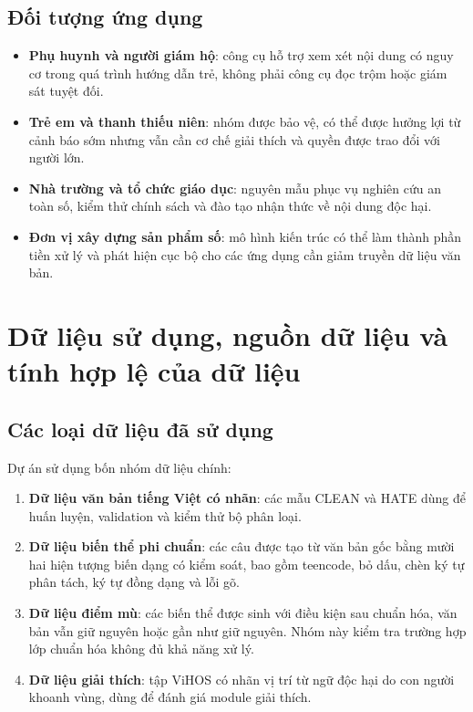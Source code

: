 \documentclass[12pt,a4paper]{article}
\begin{document}
\subsection{Đối tượng ứng dụng}
\begin{itemize}
  \item \textbf{Phụ huynh và người giám hộ}: công cụ hỗ trợ xem xét nội dung có nguy cơ trong quá trình hướng dẫn trẻ, không phải công cụ đọc trộm hoặc giám sát tuyệt đối.
  \item \textbf{Trẻ em và thanh thiếu niên}: nhóm được bảo vệ, có thể được hưởng lợi từ cảnh báo sớm nhưng vẫn cần cơ chế giải thích và quyền được trao đổi với người lớn.
  \item \textbf{Nhà trường và tổ chức giáo dục}: nguyên mẫu phục vụ nghiên cứu an toàn số, kiểm thử chính sách và đào tạo nhận thức về nội dung độc hại.
  \item \textbf{Đơn vị xây dựng sản phẩm số}: mô hình kiến trúc có thể làm thành phần tiền xử lý và phát hiện cục bộ cho các ứng dụng cần giảm truyền dữ liệu văn bản.
\end{itemize}

\section{Dữ liệu sử dụng, nguồn dữ liệu và tính hợp lệ của dữ liệu}
\subsection{Các loại dữ liệu đã sử dụng}
Dự án sử dụng bốn nhóm dữ liệu chính:
\begin{enumerate}
  \item \textbf{Dữ liệu văn bản tiếng Việt có nhãn}: các mẫu CLEAN và HATE dùng để huấn luyện, validation và kiểm thử bộ phân loại.
  \item \textbf{Dữ liệu biến thể phi chuẩn}: các câu được tạo từ văn bản gốc bằng mười hai hiện tượng biến dạng có kiểm soát, bao gồm teencode, bỏ dấu, chèn ký tự phân tách, ký tự đồng dạng và lỗi gõ.
  \item \textbf{Dữ liệu điểm mù}: các biến thể được sinh với điều kiện sau chuẩn hóa, văn bản vẫn giữ nguyên hoặc gần như giữ nguyên. Nhóm này kiểm tra trường hợp lớp chuẩn hóa không đủ khả năng xử lý.
  \item \textbf{Dữ liệu giải thích}: tập ViHOS có nhãn vị trí từ ngữ độc hại do con người khoanh vùng, dùng để đánh giá module giải thích.
\end{enumerate}
\end{document}
